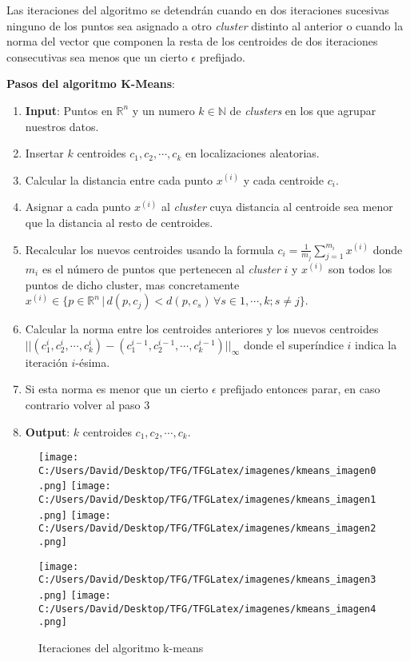 Las iteraciones del algoritmo se detendrán cuando en dos iteraciones sucesivas ninguno de los puntos 
sea asignado a otro \textit{cluster} distinto al anterior o cuando la norma del vector que componen 
la resta de los centroides de dos iteraciones consecutivas sea menos que un cierto $\epsilon$ 
prefijado.
\newline

\noindent \textbf{Pasos del algoritmo K-Means}:
\begin{enumerate}
  \item \textbf{Input}: Puntos en $\mathds{R}^n$ y un numero $k \in \mathds{N}$ de \textit{clusters}
  en los que agrupar nuestros datos.
  \item Insertar $k$ centroides $c_1, c_2, \cdots, c_k$ en localizaciones aleatorias.
  \item Calcular la distancia entre cada punto $x^{(i)}$ y cada centroide $c_i$.
  \item Asignar a cada punto $x^{(i)}$ al \textit{cluster} cuya distancia al centroide sea menor 
        que la distancia al resto de centroides.
  \item Recalcular los nuevos centroides usando la formula $c_i = \frac{1}{m_j} \sum_{j=1}^{m_i}x^{(i)}$ 
        donde $m_i$ es el número de puntos que pertenecen al \textit{cluster} $i$ y $x^{(i)}$ son 
        todos los puntos de dicho cluster, mas concretamente \\
        $x^{(i)} \in \{ p \in \mathds{R}^n \, | \, d(p, c_j) < d(p, c_s) \, \forall s \in 1, \cdots, k; s \neq j \}$.
  \item Calcular la norma entre los centroides anteriores y los nuevos centroides \\
        $ ||(c_1^i, c_2^i, \cdots, c_k^i) - (c_1^{i-1}, c_2^{i-1}, \cdots, c_k^{i-1})||_{\infty} $ 
        donde el superíndice $i$ indica la iteración $i$-ésima.
  \item Si esta norma es menor que un cierto $\epsilon$ prefijado entonces parar, en caso contrario 
        volver al paso $3$        
  \item \textbf{Output}: $k$ centroides $c_1, c_2, \cdots, c_k$.
\end{enumerate}


\begin{figure}[htp]
  \centering
  \texttt{[image: C:/Users/David/Desktop/TFG/TFGLatex/imagenes/kmeans\_imagen0.png]}\quad
  \texttt{[image: C:/Users/David/Desktop/TFG/TFGLatex/imagenes/kmeans\_imagen1.png]}\quad
  \texttt{[image: C:/Users/David/Desktop/TFG/TFGLatex/imagenes/kmeans\_imagen2.png]}

  \medskip

  \texttt{[image: C:/Users/David/Desktop/TFG/TFGLatex/imagenes/kmeans\_imagen3.png]}\quad
  \texttt{[image: C:/Users/David/Desktop/TFG/TFGLatex/imagenes/kmeans\_imagen4.png]}

  \caption{Iteraciones del algoritmo k-means}
  \label{kmeans_iteraciones} %
\end{figure}

